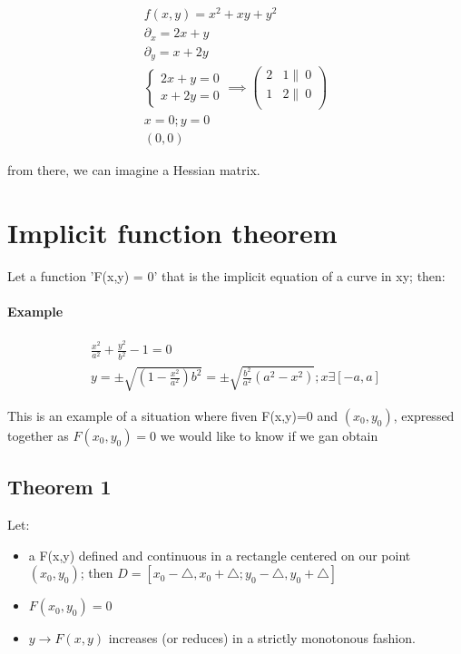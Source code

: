 \documentclass[11pt,fleqn]{book} %
\begin{document}
\begin{gather}
    f(x,y) =  x^2 + xy + y^2 \\
    \partial_x = 2x + y\\
    \partial_y = x + 2y\\
    \begin{cases}
        2x + y = 0\\
        x + 2y = 0
    \end{cases}
    \implies \begin{pmatrix}
        2 & 1 \|\ 0\\
        1 & 2 \|\ 0\\
    \end{pmatrix}\\
    x=0 ; y=0\\
    (0,0)
\end{gather}

from there, we can imagine a Hessian matrix.

\section{Implicit function theorem}

Let a function 'F(x,y) = 0' that is the implicit equation of a curve in xy;
then:

\paragraph*{Example}
\begin{gather}
    \frac{x^2}{a^2} + \frac{y^2}{b^2} - 1 = 0 \\
    y = \pm \sqrt{(1-\frac{x^2}{a^2})b^2} = \pm \sqrt{\frac{b^2}{a^2}(a^2 - x^2)}; x \exists [-a, a]
\end{gather}

This is an example of a situation where fiven F(x,y)=0 and $ (x_0, y_0) $, expressed together
as $F(x_0,y_0)=0$ we would like to know if we gan obtain

\subsection{Theorem 1}
Let:

\begin{itemize}
    \item a F(x,y) defined and continuous in a rectangle centered on our point $(x_0, y_0)$; then
    $ D = [x_0 - \triangle, x_0 + \triangle; y_0 - \triangle, y_0 + \triangle] $
    \item $F(x_0, y_0) = 0$
    \item $y \rightarrow F(x,y)$ increases (or reduces) in a strictly monotonous fashion.
\end{itemize}
\end{document}

